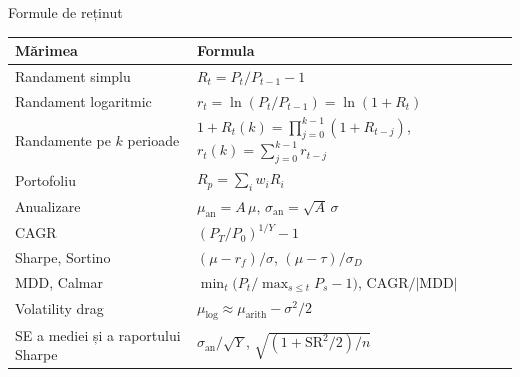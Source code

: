 \begin{frame}{Formule de reținut}
\itemsize{\small}
\begin{center}
\footnotesize
\begin{tabular}{ll}
\toprule
\textbf{Mărimea} & \textbf{Formula} \\
\midrule
Randament simplu & $R_t = P_t/P_{t-1} - 1$ \\
Randament logaritmic & $r_t = \ln(P_t/P_{t-1}) = \ln(1 + R_t)$ \\
Randamente pe $k$ perioade & $1 + R_t(k) = \prod_{j=0}^{k-1}(1 + R_{t-j})$, \quad $r_t(k) = \sum_{j=0}^{k-1} r_{t-j}$ \\
Portofoliu & $R_p = \sum_i w_i R_i$ \\
Anualizare & $\mu_{\text{an}} = A\,\mu$, \quad $\sigma_{\text{an}} = \sqrt{A}\,\sigma$ \\
CAGR & $(P_T/P_0)^{1/Y} - 1$ \\
Sharpe, Sortino & $(\mu - r_f)/\sigma$, \quad $(\mu - \tau)/\sigma_D$ \\
MDD, Calmar & $\min_t \big(P_t / \max_{s \le t} P_s - 1\big)$, \quad $\text{CAGR}/|\text{MDD}|$ \\
Volatility drag & $\mu_{\text{log}} \approx \mu_{\text{arith}} - \sigma^2/2$ \\
SE a mediei și a raportului Sharpe & $\sigma_{\text{an}}/\sqrt{Y}$, \quad $\sqrt{(1 + \text{SR}^2/2)/n}$ \\
\bottomrule
\end{tabular}
\end{center}
\end{frame}

